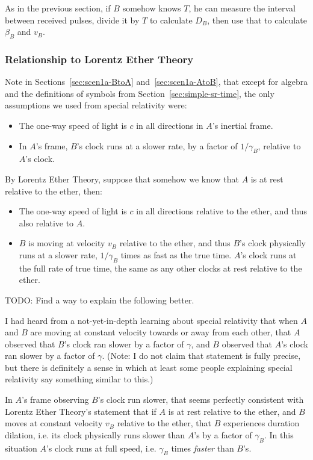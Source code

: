 \documentclass[a4paper]{article}
\theoremstyle{plain}
\theoremstyle{definition}
\begin{document}
As in the previous section, if $B$ somehow knows $T$,
he can measure the interval between received pulses,
divide it by $T$ to calculate $D_B$,
then use that to calculate $\beta_B$ and $v_B$.


\subsubsection{Relationship to Lorentz Ether Theory}
\label{sec:scen1a-LET}

Note in Sections~\ref{sec:scen1a-BtoA} and~\ref{sec:scen1a-AtoB}, that
except for algebra and the definitions of symbols from
Section~\ref{sec:simple-sr-time}, the only assumptions we used from
special relativity were:
\begin{itemize}
\item The one-way speed of light is $c$ in all directions in $A$'s
  inertial frame.
\item In $A$'s frame, $B$'s clock runs at a slower rate, by a factor
  of $1/\gamma_B$, relative to $A$'s clock.
\end{itemize}
By Lorentz Ether Theory, suppose that somehow we know that $A$ is at
rest relative to the ether, then:
\begin{itemize}
\item The one-way speed of light is $c$ in all directions relative to
  the ether, and thus also relative to $A$.
\item $B$ is moving at velocity $v_B$ relative to the ether, and thus
  $B$'s clock physically runs at a slower rate, $1/\gamma_B$ times as
  fast as the true time.  $A$'s clock runs at the full rate of true
  time, the same as any other clocks at rest relative to the ether.
\end{itemize}

TODO: Find a way to explain the following better.

I had heard from a not-yet-in-depth learning about special relativity
that when $A$ and $B$ are moving at constant velocity towards or away
from each other, that $A$ observed that $B$'s clock ran slower by a
factor of $\gamma$, and $B$ observed that $A$'s clock ran slower by a
factor of $\gamma$.  (Note: I do not claim that statement is fully
precise, but there is definitely a sense in which at least some people
explaining special relativity say something similar to this.)

In $A$'s frame observing $B$'s clock run slower, that seems perfectly
consistent with Lorentz Ether Theory's statement that if $A$ is at
rest relative to the ether, and $B$ moves at constant velocity $v_B$
relative to the ether, that $B$ experiences duration dilation,
i.e. its clock physically runs slower than $A$'s by a factor of
$\gamma_B$.  In this situation $A$'s clock runs at full speed,
i.e. $\gamma_B$ times {\em faster} than $B$'s.
\end{document}
